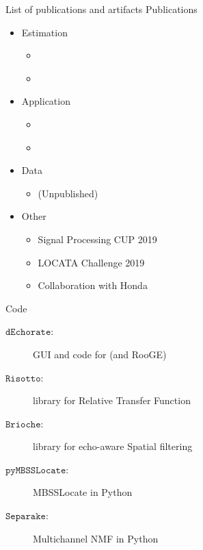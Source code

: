 \begin{frame}{List of publications and artifacts}
    Publications
    \begin{itemize}
        \small
        \item Estimation
        \begin{itemize}
            \item \lantern \cite{di2019mirage}
            \item \dechorate \cite{di2020blaster}
        \end{itemize}
        \item Application
        \begin{itemize}
            \item \mirage \cite{di2019mirage}
            \item \separake \cite{scheibler2018separake}
        \end{itemize}
        \item Data
        \begin{itemize}
            \item \dechorate (Unpublished)
        \end{itemize}
        \item Other
        \begin{itemize}
            \item Signal Processing CUP 2019 \cite{deleforge2019audio}
            \item LOCATA Challenge 2019 \cite{lebarbenchon2018evaluation}
            \item Collaboration with Honda \cite{di2019honda}
        \end{itemize}
    \end{itemize}

    \begin{block}{Code}
        \small
        \begin{description}
            \item[$\mathtt{dEchorate}$:] GUI and code for \dechorate (and RooGE)
            \item[$\mathtt{Risotto}$:] library for Relative Transfer Function
            \item[$\mathtt{Brioche}$:] library for echo-aware Spatial filtering
            \item[$\mathtt{pyMBSSLocate}$:] MBSSLocate in Python
            \item[$\mathtt{Separake}$:] Multichannel NMF in Python
        \end{description}
    \end{block}
\end{frame}